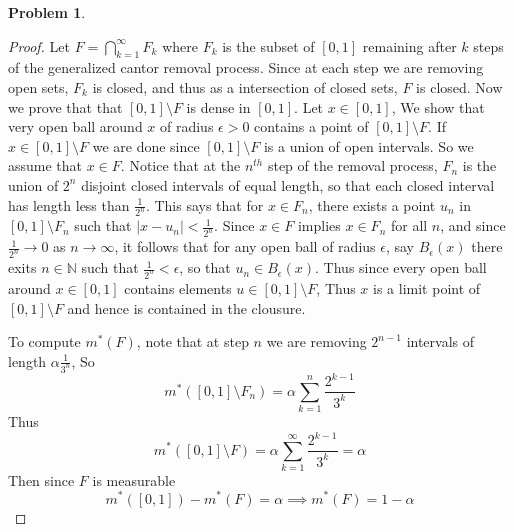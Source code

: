 \documentclass{article}
\newcommand{\N}{\mathbb{N}}
\newcommand{\m}{m^*}
\newtheorem{prb}{Problem}
\begin{document}
            \begin{prb}  \end{prb} 
            \begin{proof} 
		    Let $F = \bigcap_{k =1}^\infty F_k$ where $F_k$ is the subset of $[0, 1]$ remaining after 
		    $k$ steps of the generalized cantor removal process. Since at each step we are removing open sets, 
		    $F_k$ is closed, and thus as a intersection of closed sets, $F$ is closed.
		    Now we prove that that $[0, 1]\setminus F$ is dense in $[0, 1]$. Let $x \in [0, 1]$, 
		    We show that very open ball around $x$ of 
		    radius $\epsilon > 0$ contains a point of $[0, 1]\setminus F$. 
		    If $x \in [0, 1] \setminus F$ 
		    we are done since $[0, 1]\setminus F$ is a union of open intervals. So we assume that $x \in F$. 
		    Notice that at the $n^{th}$ step of the removal process, 
		   $F_n$ is the union of $2^n$ disjoint closed intervals of equal length, 
		   so that each closed interval has length less than $\tfrac{1}{2^n}$. This says that for $x \in F_n$, 
		    there exists a point $u_n$ in $[0, 1]\setminus F_n$ such that $|x - u_n| < \tfrac{1}{2^n}$.
		    Since $x \in F$ implies $x \in F_n$ for all $n$, and since $\tfrac{1}{2^n} \to 0$ as $n \to \infty$,	            it follows that for any open ball of radius $\epsilon$, say $B_\epsilon(x)$ there exits $n \in \N$ such that 
		    $\tfrac{1}{2^n} < \epsilon$, so that $u_n \in B_\epsilon(x)$.  
		    Thus since every open ball around $x \in [0, 1]$ contains elements $u \in [0, 1]\setminus F$, Thus
		    $x$ is a limit point of $[0, 1]\setminus F$ and hence is contained in the clousure. 
		    
		    To compute $\m(F)$, note that at step $n$ we are removing 
		    $2^{n-1}$ intervals of length $\alpha \tfrac{1}{3^n}$, So 
		    \[ \m([0, 1]\setminus F_n) = \alpha \sum_{k =1}^n \frac{2^{k-1}}{3^k} \] 
		    Thus 
		    \[ \m([0, 1] \setminus F) = \alpha \sum_{k = 1}^\infty \frac{2^{k-1}}{3^k} = \alpha \] 
		Then since $F$ is measurable 
		\[ \m([0, 1]) - \m(F) = \alpha \implies \m(F) = 1 - \alpha \] 
            \end{proof} 
\end{document}
